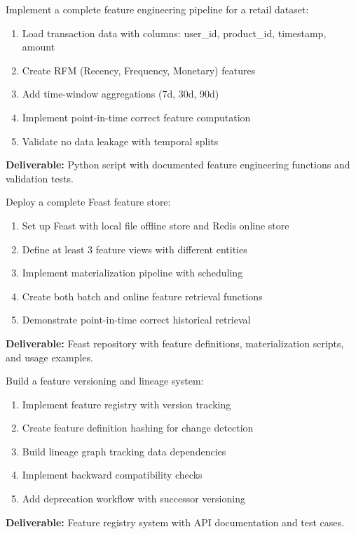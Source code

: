 \begin{exercise}
Implement a complete feature engineering pipeline for a retail dataset:
\begin{enumerate}
    \item Load transaction data with columns: user\_id, product\_id, timestamp, amount
    \item Create RFM (Recency, Frequency, Monetary) features
    \item Add time-window aggregations (7d, 30d, 90d)
    \item Implement point-in-time correct feature computation
    \item Validate no data leakage with temporal splits
\end{enumerate}
\textbf{Deliverable:} Python script with documented feature engineering functions and validation tests.
\end{exercise}

\begin{exercise}
Deploy a complete Feast feature store:
\begin{enumerate}
    \item Set up Feast with local file offline store and Redis online store
    \item Define at least 3 feature views with different entities
    \item Implement materialization pipeline with scheduling
    \item Create both batch and online feature retrieval functions
    \item Demonstrate point-in-time correct historical retrieval
\end{enumerate}
\textbf{Deliverable:} Feast repository with feature definitions, materialization scripts, and usage examples.
\end{exercise}

\begin{exercise}
Build a feature versioning and lineage system:
\begin{enumerate}
    \item Implement feature registry with version tracking
    \item Create feature definition hashing for change detection
    \item Build lineage graph tracking data dependencies
    \item Implement backward compatibility checks
    \item Add deprecation workflow with successor versioning
\end{enumerate}
\textbf{Deliverable:} Feature registry system with API documentation and test cases.
\end{exercise}

